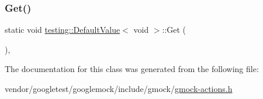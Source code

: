\subsubsection{\texorpdfstring{Get()}{Get()}}
{\footnotesize\ttfamily static void \hyperlink{classtesting_1_1_default_value}{testing\+::\+Default\+Value}$<$ void $>$\+::Get (\begin{DoxyParamCaption}{ }\end{DoxyParamCaption})\hspace{0.3cm}{\ttfamily [inline]}, {\ttfamily [static]}}



The documentation for this class was generated from the following file\+:\begin{DoxyCompactItemize}
\item 
vendor/googletest/googlemock/include/gmock/\hyperlink{gmock-actions_8h}{gmock-\/actions.\+h}\end{DoxyCompactItemize}
